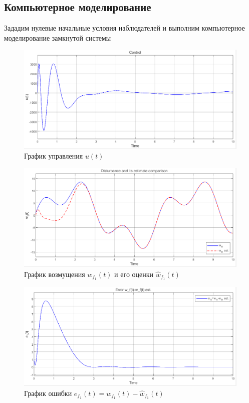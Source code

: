 \documentclass[a4paper, 12pt]{article}
\begin{document}
    \subsection{Компьютерное моделирование}
    Зададим нулевые начальные условия наблюдателей и выполним компьютерное моделирование замкнутой системы
    \begin{figure}[H]
        \centering
        \includegraphics[scale=0.6]{2task_u.png}
        \captionsetup{skip=0pt}
        \caption{График управления $u(t)$}
        \label{fig:2task_u}
    \end{figure}
    \begin{figure}[H]
        \centering
        \includegraphics[scale=0.6]{2task_wfhwf1.png}
        \captionsetup{skip=0pt}
        \caption{График возмущения $w_{f_1}(t)$ и его оценки $\hat{w}_{f_1}(t)$}
        \label{fig:2task_wfhwf1}
    \end{figure}
    \begin{figure}[H]
        \centering
        \includegraphics[scale=0.6]{2task_ef1.png}
        \captionsetup{skip=0pt}
        \caption{График ошибки $e_{f_1}(t)=w_{f_1}(t)-\hat{w}_{f_1}(t)$}
        \label{fig:2task_ef1}
    \end{figure}
\end{document}
